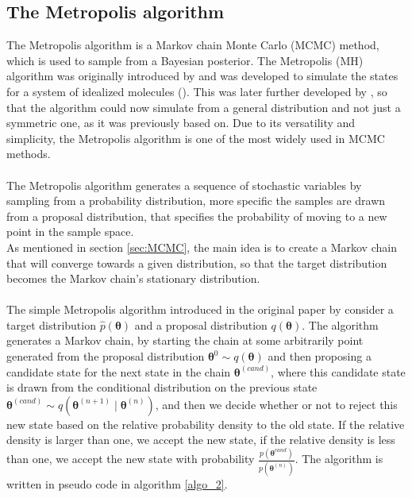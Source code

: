 \subsection{The Metropolis algorithm} \label{sec:Metropolis_Hastings}
The Metropolis algorithm is a Markov chain Monte Carlo (MCMC) method, which is used to sample from a Bayesian posterior. 
The Metropolis (MH) algorithm was originally introduced by \cite{Metropolis1953} and was developed to simulate the states for a system of idealized molecules (\cite{neal2012mcmc}). This was later further developed by \cite{hastings70}, so that the algorithm could now simulate from a general distribution and not just a symmetric one, as it was previously based on. Due to its versatility and simplicity, the Metropolis algorithm is one of the most widely used in MCMC methods.\\
\\
The Metropolis algorithm generates a sequence of stochastic variables by sampling from a probability distribution, more specific the samples are drawn from a proposal distribution, that specifies the probability of moving to a new point in the sample space. \\
As mentioned in section \ref{sec:MCMC}, the main idea is to create a Markov chain that will converge towards a given distribution, so that the target distribution becomes the Markov chain's stationary distribution.  \\
\\
The simple Metropolis algorithm introduced in the original paper by \cite{Metropolis1953} consider a target distribution $\hat{p}(\boldsymbol{\theta})$ and a proposal distribution $q(\boldsymbol{\theta})$. The algorithm generates a Markov chain, by starting the chain at some arbitrarily point generated from the proposal distribution $\boldsymbol{\theta}^{0}\sim q(\boldsymbol{\theta})$ and then proposing a candidate state for the next state in the chain $\boldsymbol{\theta}^{(cand)}$, where this candidate state is drawn from the conditional distribution on the previous state $\boldsymbol{\theta}^{(cand)}\sim q(\boldsymbol{\theta}^{(n+1)}\mid\boldsymbol{\theta}^{(n)})$, and then we decide whether or not to reject this new state based on the relative probability density to the old state. If the relative density is larger than one, we accept the new state, if the relative density is less than one, we accept the new state with probability $\frac{p(\boldsymbol{\theta}^{cand})}{p(\boldsymbol{\theta}^{(n)})}$. The algorithm is written in pseudo code in algorithm \ref{algo_2}.

